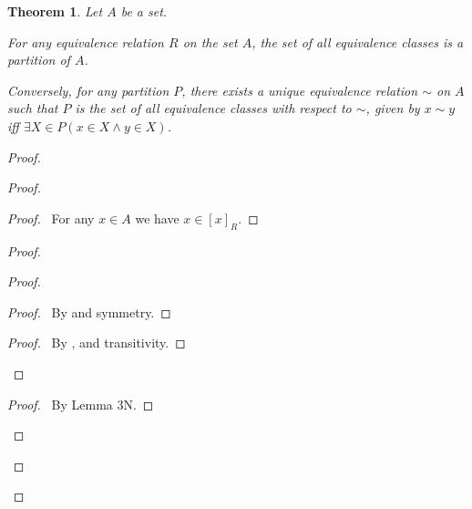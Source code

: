 \documentclass{report}
\newtheorem{theorem}[axiom]{Theorem}
\theoremstyle{definition}
\begin{document}
    \begin{theorem}
        Let $A$ be a set.

        For any equivalence relation $R$ on the set $A$, the set of all equivalence classes is a
        partition of $A$. 
        
        Conversely, for any partition $P$, there exists a unique equivalence relation $\sim$ on $A$ such
        that $P$ is the set of all equivalence classes with respect to $\sim$, given by $x \sim y$
        iff $\exists X \in P (x \in X \wedge y \in X)$.
    \end{theorem}

    \begin{proof}
        \pf
        \begin{proof}
            \begin{proof}
                \pf\ For any $x \in A$ we have $x \in [x]_R$.
            \end{proof}
            \begin{proof}
                \begin{proof}
                    \begin{proof}
                        \pf\ By  and symmetry.
                    \end{proof}
                    \begin{proof}
                        \pf\ By ,  and transitivity.
                    \end{proof}
                \end{proof}
                \begin{proof}
                    \pf\ By Lemma 3N.
                \end{proof}
            \end{proof}

\end{proof}
\end{proof}
\end{document}
